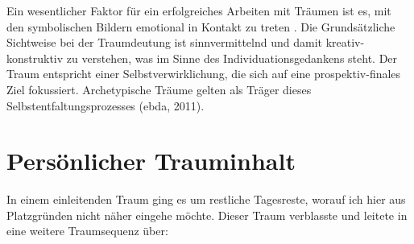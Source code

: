 Ein wesentlicher Faktor für ein erfolgreiches Arbeiten mit Träumen ist es, mit den symbolischen Bildern emotional in Kontakt zu treten \cite{Roth:2011}. Die Grundsätzliche Sichtweise bei der Traumdeutung ist sinnvermittelnd und damit kreativ-konstruktiv zu verstehen, was im Sinne des Individuationsgedankens steht. Der Traum entspricht einer Selbstverwirklichung, die sich auf eine prospektiv-finales Ziel fokussiert. Archetypische Träume gelten als Träger dieses Selbstentfaltungsprozesses (ebda, 2011).
\section*{Persönlicher Trauminhalt}\label{section.eigenerTraum}
In einem einleitenden Traum ging es um restliche Tagesreste, worauf ich hier aus Platzgründen nicht näher eingehe möchte. Dieser Traum verblasste und leitete in eine weitere Traumsequenz über: \par 
